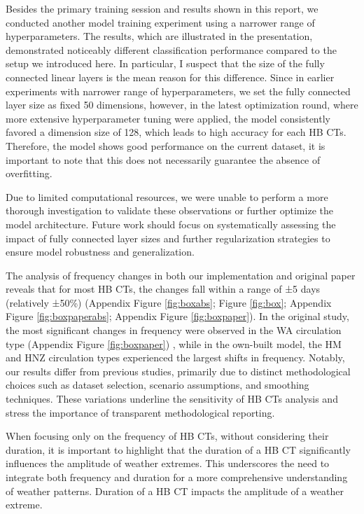 \documentclass[
]{krantz}
\begin{document}
Besides the primary training session and results shown in this report,
we conducted another model training experiment using a narrower range of hyperparameters.
The results, which are illustrated in the presentation, demonstrated noticeably different classification performance compared to the setup we introduced here.
In particular, I suspect that the size of the fully connected linear layers is the mean reason for this difference. Since in earlier experiments with narrower range of hyperparameters, we set the fully connected layer size as fixed 50 dimensions, however, in the latest optimization round, where more extensive hyperparameter tuning were applied, the model consistently favored a dimension size of 128, which leads to high accuracy for each HB CTs. Therefore, the model shows good performance on the current dataset, it is important to note that this does not necessarily guarantee the absence of overfitting.

Due to limited computational resources, we were unable to perform a more thorough investigation to validate these observations or further optimize the model architecture. Future work should focus on systematically assessing the impact of fully connected layer sizes and further regularization strategies to ensure model robustness and generalization.

The analysis of frequency changes in both our implementation and original paper reveals that for most HB CTs, the changes fall within a range of ±5 days (relatively ±50\%) (Appendix Figure \ref{fig:boxabs}; Figure \ref{fig:box}; Appendix Figure \ref{fig:boxpaperabs}; Appendix Figure \ref{fig:boxpaper}). In the original study, the most significant changes in frequency were observed in the WA circulation type (Appendix Figure \ref{fig:boxpaper}) \citep{Mittermeier2022}, while in the own-built model, the HM and HNZ circulation types experienced the largest shifts in frequency. Notably, our results differ from previous studies, primarily due to distinct methodological choices such as dataset selection, scenario assumptions, and smoothing techniques. These variations underline the sensitivity of HB CTs analysis and stress the importance of transparent methodological reporting.

When focusing only on the frequency of HB CTs, without considering their duration, it is important to highlight that the duration of a HB CT significantly influences the amplitude of weather extremes. This underscores the need to integrate both frequency and duration for a more comprehensive understanding of weather patterns. Duration of a HB CT impacts the amplitude of a weather extreme.
\end{document}
